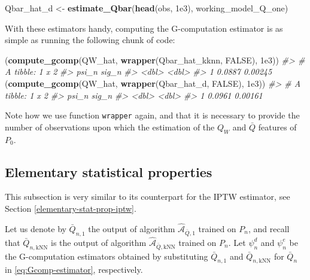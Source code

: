 \documentclass[11pt,openright,twoside]{book}
\newenvironment{Shaded}{\begin{snugshade}}{\end{snugshade}}
\newcommand{\CommentTok}[1]{\textcolor[rgb]{0.56,0.35,0.01}{\textit{#1}}}
\newcommand{\FloatTok}[1]{\textcolor[rgb]{0.00,0.00,0.81}{#1}}
\newcommand{\KeywordTok}[1]{\textcolor[rgb]{0.13,0.29,0.53}{\textbf{#1}}}
\newcommand{\NormalTok}[1]{#1}
\newcommand{\OtherTok}[1]{\textcolor[rgb]{0.56,0.35,0.01}{#1}}
\newcommand{\StringTok}[1]{\textcolor[rgb]{0.31,0.60,0.02}{#1}}
\newcommand{\Algo}{\widehat{\mathcal{A}}}
\newcommand{\Qbar}{\bar{Q}}
\theoremstyle{definition}
\theoremstyle{definition}
\theoremstyle{definition}
\theoremstyle{remark}
\begin{document}
\begin{Shaded}
\begin{Highlighting}[]
\NormalTok{Qbar_hat_d <-}\StringTok{ }\KeywordTok{estimate_Qbar}\NormalTok{(}\KeywordTok{head}\NormalTok{(obs, }\FloatTok{1e3}\NormalTok{), working_model_Q_one)}
\end{Highlighting}
\end{Shaded}

With these estimators handy, computing the G-computation estimator is as
simple as running the following chunk of code:

\begin{Shaded}
\begin{Highlighting}[]
\NormalTok{(}\KeywordTok{compute_gcomp}\NormalTok{(QW_hat, }\KeywordTok{wrapper}\NormalTok{(Qbar_hat_kknn, }\OtherTok{FALSE}\NormalTok{), }\FloatTok{1e3}\NormalTok{))}
\CommentTok{#> # A tibble: 1 x 2}
\CommentTok{#>    psi_n   sig_n}
\CommentTok{#>    <dbl>   <dbl>}
\CommentTok{#> 1 0.0887 0.00245}
\NormalTok{(}\KeywordTok{compute_gcomp}\NormalTok{(QW_hat, }\KeywordTok{wrapper}\NormalTok{(Qbar_hat_d, }\OtherTok{FALSE}\NormalTok{), }\FloatTok{1e3}\NormalTok{))}
\CommentTok{#> # A tibble: 1 x 2}
\CommentTok{#>    psi_n   sig_n}
\CommentTok{#>    <dbl>   <dbl>}
\CommentTok{#> 1 0.0961 0.00161}
\end{Highlighting}
\end{Shaded}

Note how we use function \texttt{wrapper} again, and that it is necessary to provide
the number of observations upon which the estimation of the \(Q_{W}\) and
\(\Qbar\) features of \(P_{0}\).

\hypertarget{elementary-statistical-properties-1}{%
\subsection{Elementary statistical properties}\label{elementary-statistical-properties-1}}

This subsection is very similar to its counterpart for the IPTW estimator, see
Section \ref{elementary-stat-prop-iptw}.

Let us denote by \(\Qbar_{n,1}\) the output of algorithm \(\Algo_{\Qbar,1}\)
trained on \(P_{n}\), and recall that \(\Qbar_{n,\text{kNN}}\) is the output of
algorithm \(\Algo_{\Qbar,\text{kNN}}\) trained on \(P_{n}\). Let \(\psi_{n}^{d}\)
and \(\psi_{n}^{e}\) be the G-computation estimators obtained by substituting
\(\Qbar_{n,1}\) and \(\Qbar_{n,\text{kNN}}\) for \(\Qbar_{n}\) in
\eqref{eq:Gcomp-estimator}, respectively.
\end{document}
